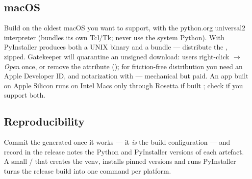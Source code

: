 \subsection{macOS}

Build on the oldest macOS you want to support, with the python.org
universal2 interpreter (bundles its own Tcl/Tk; never use the system
Python). With  PyInstaller produces both a UNIX binary
and a  bundle --- distribute the , zipped.
Gatekeeper will quarantine an unsigned download: users right-click
$\to$ \emph{Open} once, or remove the attribute
(); for friction-free
distribution you need an Apple Developer ID,  and notarization with  --- mechanical
but paid. An app built on Apple Silicon runs on Intel Macs only through
Rosetta if built ; check
 if you support
both.

\subsection{Reproducibility}

Commit the generated  once it works --- it \emph{is}
the build configuration --- and record in the release notes the Python
and PyInstaller versions of each artefact. A small
/ that creates the venv, installs pinned
versions and runs PyInstaller turns the release build into one command
per platform.
